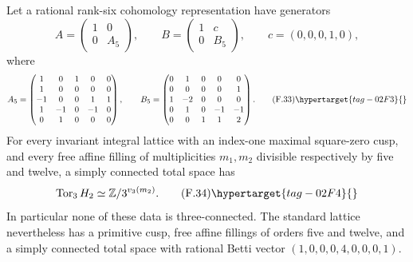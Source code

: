 \begin{theorem}\hypertarget{tag-02N1}{}\label{maps:src:F.2.12}


Let a rational rank-six cohomology representation have generators
\[
 A=\begin{pmatrix}1&0\\0&A_5\end{pmatrix},\qquad
 B=\begin{pmatrix}1&c\\0&B_5\end{pmatrix},\qquad
 c=(0,0,0,1,0),
\]
where
\[
 A_5=\begin{pmatrix}
 1&0&1&0&0\\1&0&0&0&0\\-1&0&0&1&1\\
 1&-1&0&-1&0\\0&1&0&0&0
 \end{pmatrix},\qquad
 B_5=\begin{pmatrix}
 0&1&0&0&0\\0&0&0&0&1\\1&-2&0&0&0\\
 0&1&0&-1&-1\\0&0&1&1&2
 \end{pmatrix}.
 \tag{F.33}\hypertarget{tag-02F3}{}\label{maps:eq:F.33}
\]
For every invariant integral lattice with an index-one maximal
square-zero cusp, and every free affine filling of multiplicities
$m_1,m_2$ divisible respectively by five and twelve, a simply
connected total space has
\[
 \operatorname{Tor}_3 H_2
       \simeq\mathbb Z/3^{v_3(m_2)}.
 \tag{F.34}\hypertarget{tag-02F4}{}\label{maps:eq:F.34}
\]
In particular none of these data is three-connected.
The standard lattice nevertheless has a primitive cusp,
free affine fillings of orders five and twelve, and a simply
connected total space with rational Betti vector
$(1,0,0,0,4,0,0,0,1)$.

\end{theorem}


